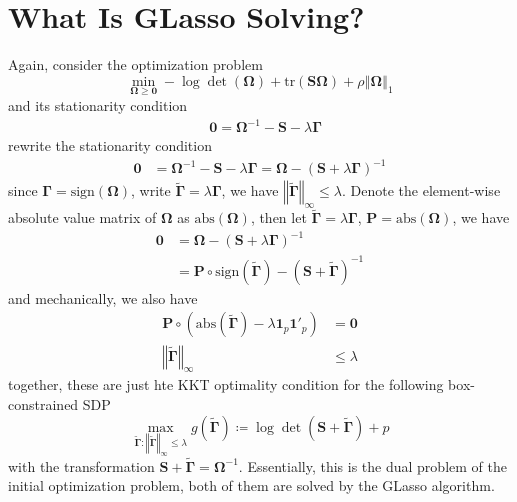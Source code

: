 \documentclass[twoside]{article}
\begin{document}
\section{What Is GLasso Solving?}
Again, consider the optimization problem 
\begin{equation*}
    \min_{\boldsymbol{\Omega}\geq \mathbf{0}} -\log \det (\boldsymbol{\Omega}) + \mathrm{tr}(\mathbf{S}\boldsymbol{\Omega}) +\rho\left\Vert \boldsymbol{\Omega} \right\Vert _1 
\end{equation*}
and its stationarity condition
\begin{align*}
    &\mathbf{0} = \boldsymbol{\Omega}^{-1} - \mathbf{S} -\lambda \boldsymbol{\Gamma}
\end{align*}
rewrite the stationarity condition
\begin{align*}
    \mathbf{0} &= \boldsymbol{\Omega}^{-1} - \mathbf{S} -\lambda \boldsymbol{\Gamma} = \boldsymbol{\Omega} - \left(\mathbf{S}+ \lambda\boldsymbol{\Gamma}\right)^{-1}
\end{align*}
since $\boldsymbol{\Gamma}=\mathrm{sign}(\boldsymbol{\Omega})$, write $\tilde{\boldsymbol{\Gamma}}=\lambda \boldsymbol{\Gamma}$, we have $\left\Vert \tilde{\boldsymbol{\Gamma}} \right\Vert _{\infty}\leq \lambda$. Denote the element-wise absolute value matrix of $\boldsymbol{\Omega}$ as $\mathrm{abs}(\boldsymbol{\Omega})$, then let $\tilde{\boldsymbol{\Gamma}} = \lambda \boldsymbol{\Gamma}$, $\mathbf{P}=\mathrm{abs}(\boldsymbol{\Omega})$, we have 
\begin{align*}
    \mathbf{0} &= \boldsymbol{\Omega} - \left(\mathbf{S}+ \lambda\boldsymbol{\Gamma}\right)^{-1}\\
    &= \mathbf{P} \circ \mathrm{sign}(\tilde{\boldsymbol{\Gamma}}) - (\mathbf{S}+\tilde{\boldsymbol{\Gamma}})^{-1}
\end{align*}
and mechanically, we also have
\begin{align*}
    \mathbf{P} \circ \left(\mathrm{abs}(\tilde{\boldsymbol{\Gamma}}) -\lambda\mathbf{1}_p\mathbf{1}'_p \right) &= \mathbf{0} \\
    \left\Vert \tilde{\boldsymbol{\Gamma}} \right\Vert _{\infty} &\leq \lambda
\end{align*}
together, these are just hte KKT optimality condition for the following box-constrained SDP
\begin{equation}
    \max_{\tilde{\boldsymbol{\Gamma}}:\left\Vert \tilde{\boldsymbol{\Gamma}} \right\Vert _{\infty}\leq \lambda} g(\tilde{\boldsymbol{\Gamma}}) \coloneq \log\det (\mathbf{S}+\tilde{\boldsymbol{\Gamma}}) + p
\end{equation}
with the transformation $\mathbf{S}+\tilde{\boldsymbol{\Gamma}} = \boldsymbol{\Omega}^{-1}$. Essentially, this is the dual problem of the initial optimization problem, both of them are solved by the GLasso algorithm.
\end{document}

